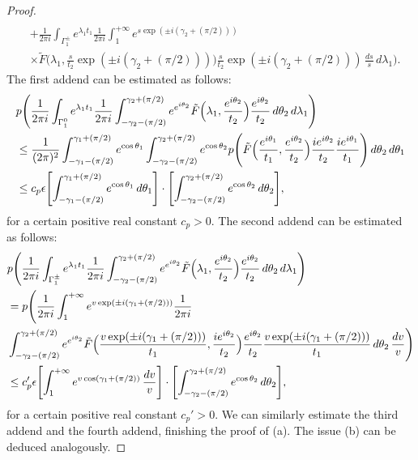 \documentclass{amsart}
\theoremstyle{definition}
\theoremstyle{remark}
\numberwithin{equation}{section}
\begin{document}
\begin{proof}
\begin{align*}
\\& +\frac{1}{2\pi i}\int_{\Gamma_{1}^{\pm}}e^{\lambda_{1}t_{1}}\frac{1}{2\pi i}\int_{1}^{+\infty}e^{s\exp(\pm i (\gamma_{2}+(\pi/2)))}\\& \times \tilde{F}\Biggl( \lambda_{1},\frac{s}{t_{2}}\exp(\pm i (\gamma_{2}+(\pi/2)))\Biggr)\frac{s}{t_{2}}\exp(\pm i (\gamma_{2}+(\pi/2)))\, \frac{ds}{s}\, d\lambda_{1}\Biggr).
\end{align*} 
The first addend can be estimated as follows:
\begin{align*}
&p\Biggl(\frac{1}{2\pi i}\int_{\Gamma_{1}^{0}}e^{\lambda_{1}t_{1}}\frac{1}{2\pi i}\int_{-\gamma_{2}-(\pi/2)}^{\gamma_{2}+(\pi/2)}e^{e^{i\theta_{2}}}\tilde{F}\Bigl(\lambda_{1},\frac{e^{i\theta_{2}}}{t_{2}} \Bigr)\frac{e^{i\theta_{2}}}{t_{2}}\, d\theta_{2}\, d\lambda_{1}\Biggr)
\\& \leq \frac{1}{(2\pi)^{2}}\int_{-\gamma_{1}-(\pi/2)}^{\gamma_{1}+(\pi/2)}e^{\cos \theta_{1}}\int_{-\gamma_{2}-(\pi/2)}^{\gamma_{2}+(\pi/2)}e^{\cos \theta_{2}}p\Biggl(\tilde{F}\Bigl( \frac{e^{i\theta_{1}}}{t_{1}},\frac{e^{i\theta_{2}}}{t_{2}}\Bigr)\frac{ie^{i\theta_{2}}}{t_{2}}\frac{ie^{i\theta_{1}}}{t_{1}} \Biggr)\, d\theta_{2}\, d\theta_{1}
\\& \leq c_{p}\epsilon \Biggl[ \int_{-\gamma_{1}-(\pi/2)}^{\gamma_{1}+(\pi/2)}e^{\cos \theta_{1}} \, d\theta_{1}\Biggr] \cdot \Biggl[ \int_{-\gamma_{2}-(\pi/2)}^{\gamma_{2}+(\pi/2)}e^{\cos \theta_{2}} \, d\theta_{2} \Biggr],
\end{align*} 
for a certain positive real constant $c_{p}>0.$  The second addend can be estimated as follows:
\begin{align*}
&p\Biggl( \frac{1}{2\pi i}\int_{\Gamma_{1}^{\pm}}e^{\lambda_{1}t_{1}}\frac{1}{2\pi i}\int_{-\gamma_{2}-(\pi/2)}^{\gamma_{2}+(\pi/2)}e^{e^{i\theta_{2}}}\tilde{F}\Bigl(\lambda_{1},\frac{e^{i\theta_{2}}}{t_{2}} \Bigr)\frac{e^{i\theta_{2}}}{t_{2}}\, d\theta_{2}\, d\lambda_{1}\Biggr)
\\& = p\Biggl( \frac{1}{2\pi i}\int_{1}^{+\infty}e^{v\exp(\pm i (\gamma_{1}+(\pi/2)))}\frac{1}{2\pi i}\\& \int_{-\gamma_{2}-(\pi/2)}^{\gamma_{2}+(\pi/2)}e^{e^{i\theta_{2}}}\tilde{F}\Bigl( \frac{v\exp(\pm i (\gamma_{1}+(\pi/2)))}{t_{1}},\frac{ie^{i\theta_{2}}}{t_{2}} \Bigr)\frac{e^{i\theta_{2}}}{t_{2}}\frac{v\exp(\pm i (\gamma_{1}+(\pi/2)))}{t_{1}}\, d\theta_{2}\, \frac{dv}{v}\Biggr)
\\& \leq c_{p}'\epsilon \Biggl[ \int_{1}^{+\infty}e^{v\cos (\gamma_{1}+(\pi/2))}\,\frac{dv}{v} \Biggr] \cdot \Biggl[ \int_{-\gamma_{2}-(\pi/2)}^{\gamma_{2}+(\pi/2)}e^{\cos \theta_{2}} \, d\theta_{2} \Biggr],
\end{align*} 
for a certain positive real constant $c_{p}'>0.$
We can similarly estimate the third addend and the fourth addend, finishing the proof of (a). 
The issue (b) can be deduced analogously.
\end{proof}
\end{document}
